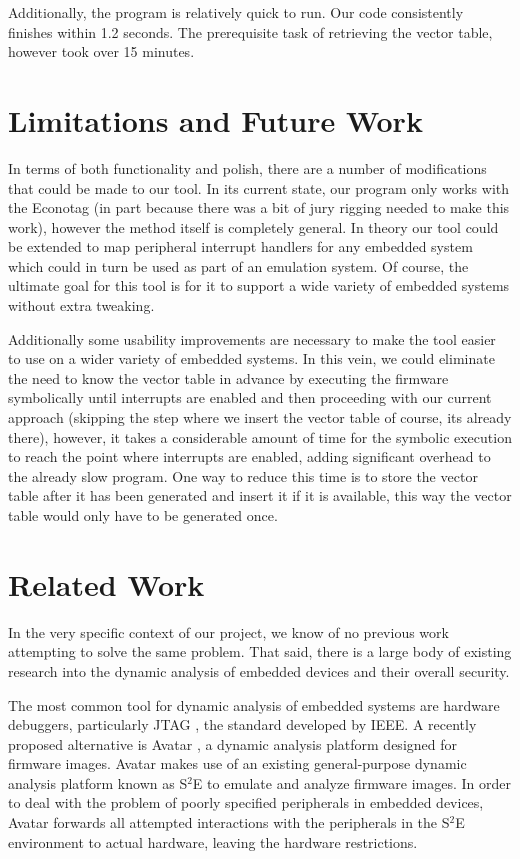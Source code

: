 \documentclass[letterpaper, 10 pt, conference]{ieeeconf}
\begin{document}
Additionally, the program is relatively quick to run. Our code consistently finishes within 1.2 seconds. The prerequisite task of retrieving the vector table, however took over 15 minutes. 

\section{Limitations and Future Work} \label{limits}
In terms of both functionality and polish, there are a number of modifications that could be made to our tool. In its current state, our program only works with the Econotag (in part because there was a bit of jury rigging needed to make this work), however the method itself is completely general. In theory our tool could be extended to map peripheral interrupt handlers for any embedded system which could in turn be used as part of an emulation system. Of course, the ultimate goal for this tool is for it to support a wide variety of embedded systems without extra tweaking. 

Additionally some usability improvements are necessary to make the tool easier to use on a wider variety of embedded systems. In this vein, we could eliminate the need to know the vector table in advance by executing the firmware symbolically until interrupts are enabled and then proceeding with our current approach (skipping the step where we insert the vector table of course, its already there), however, it takes a considerable amount of time for the symbolic execution to reach the point where interrupts are enabled, adding significant overhead to the already slow program. One way to reduce this time is to store the vector table after it has been generated and insert it if it is available, this way the vector table would only have to be generated once.

\section{Related Work} \label{relatedWork}
In the very specific context of our project, we know of no previous work attempting to solve the same problem. That said, there is a large body of existing research into the dynamic analysis of embedded devices and their overall security.

The most common tool for dynamic analysis of embedded systems are hardware debuggers, particularly JTAG \cite{jtag}, the standard developed by IEEE. 
A recently proposed alternative is Avatar \cite{avatar}, a dynamic analysis platform designed for firmware images. Avatar makes use of an existing general-purpose dynamic analysis platform known as S$^2$E \cite{s2e} to emulate and analyze firmware images. In order to deal with the problem of poorly specified peripherals in embedded devices, Avatar forwards all attempted interactions with the peripherals in the S$^2$E environment to actual hardware, leaving the hardware restrictions. 
\end{document}
